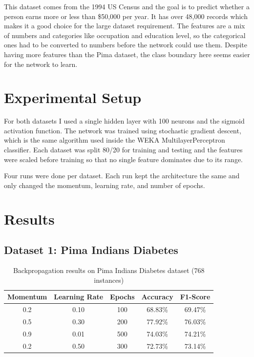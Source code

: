 \documentclass[12pt,a4paper]{article}
\begin{document}
This dataset comes from the 1994 US Census and the goal is to predict whether
a person earns more or less than \$50,000 per year. It has over 48,000 records
which makes it a good choice for the large dataset requirement. The features
are a mix of numbers and categories like occupation and education level, so
the categorical ones had to be converted to numbers before the network could
use them. Despite having more features than the Pima dataset, the class
boundary here seems easier for the network to learn.

\section{Experimental Setup}

For both datasets I used a single hidden layer with 100 neurons and the
sigmoid activation function. The network was trained using stochastic gradient
descent, which is the same algorithm used inside the WEKA MultilayerPerceptron
classifier. Each dataset was split 80/20 for training and testing and the
features were scaled before training so that no single feature dominates due
to its range.

Four runs were done per dataset. Each run kept the architecture the same and
only changed the momentum, learning rate, and number of epochs.

\section{Results}

\subsection{Dataset 1: Pima Indians Diabetes}

\begin{table}[h]
\centering
\caption{Backpropagation results on Pima Indians Diabetes dataset (768 instances)}
\label{tab:diabetes}
\begin{tabular}{ccccc}
\toprule
\textbf{Momentum} & \textbf{Learning Rate} & \textbf{Epochs} & \textbf{Accuracy} & \textbf{F1-Score} \\
\midrule
0.2 & 0.10 & 100 & 68.83\% & 69.47\% \\
0.5 & 0.30 & 200 & 77.92\% & 76.03\% \\
0.9 & 0.01 & 500 & 74.03\% & 74.21\% \\
0.2 & 0.50 & 300 & 72.73\% & 73.14\% \\
\bottomrule
\end{tabular}
\end{table}
\end{document}
